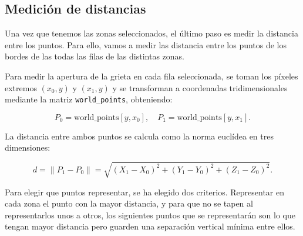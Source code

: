 
\subsection{Medición de distancias}
Una vez que tenemos las zonas seleccionados, el último paso es medir la distancia entre los puntos. Para ello, vamos a medir las distancia entre los puntos de los bordes de las todas las filas de las distintas zonas.

Para medir la apertura de la grieta en cada fila seleccionada, se toman los píxeles extremos 
\((x_0, y)\) y \((x_1, y)\) y se transforman a coordenadas tridimensionales mediante la matriz 
\texttt{world\_points}, obteniendo:

\[
P_0 = \text{world\_points}[y, x_0], \quad 
P_1 = \text{world\_points}[y, x_1].
\]

La distancia entre ambos puntos se calcula como la norma euclídea en tres dimensiones:

\[
d = \lVert P_1 - P_0 \rVert 
= \sqrt{(X_1 - X_0)^2 + (Y_1 - Y_0)^2 + (Z_1 - Z_0)^2}.
\]

Para elegir que puntos representar, se ha elegido dos criterios. Representar en cada zona el punto con la mayor distancia, y para que no se tapen al representarlos unos a otros, los siguientes puntos que se representarán son lo que tengan mayor distancia pero guarden una separación vertical mínima entre ellos.


